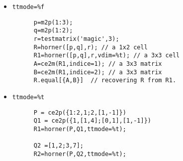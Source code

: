 \begin{examples}
  \begin{itemize}
  \item \verb!ttmode=%f!
    \begin{Verbatim}
      p=m2p(1:3);
      q=m2p(1:2);
      r=testmatrix('magic',3);
      R=horner([p,q],r); // a 1x2 cell 
      R1=horner([p,q],r,vdim=%t); // a 3x3 cell
      A=ce2m(R1,indice=1); // a 3x3 matrix 
      B=ce2m(R1,indice=2); // a 3x3 matrix 
      R.equal[{A,B}]  // recovering R from R1.
    \end{Verbatim}
  \item \verb!ttmode=%t!
    \begin{Verbatim}
      P = ce2p({1:2,1;2,[1,-1]})
      Q1 = ce2p({1,[1,4];[0,1],[1,-1]})
      R1=horner(P,Q1,ttmode=%t);
      
      Q2 =[1,2;3,7];
      R2=horner(P,Q2,ttmode=%t);
    \end{Verbatim}
  \end{itemize}
\end{examples}


